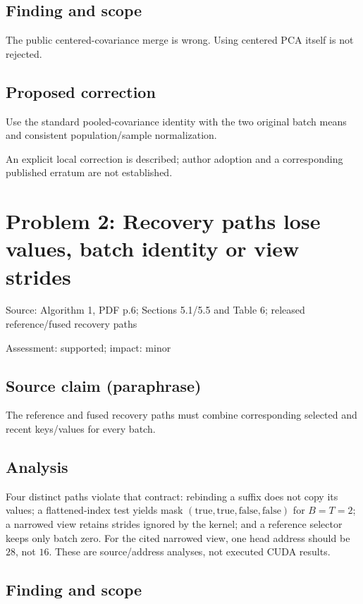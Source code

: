 \documentclass[11pt]{article}
\begin{document}
\subsection*{Finding and scope}

The public centered-covariance merge is wrong. Using centered PCA itself is not rejected.

\subsection*{Proposed correction}

Use the standard pooled-covariance identity with the two original batch means and consistent population/sample normalization.

An explicit local correction is described; author adoption and a corresponding published erratum are not established.

\section*{Problem 2: Recovery paths lose values, batch identity or view strides}

Source: Algorithm 1, PDF p.6; Sections 5.1/5.5 and Table 6; released reference/fused recovery paths

Assessment: supported; impact: minor

\subsection*{Source claim (paraphrase)}

The reference and fused recovery paths must combine corresponding selected and recent keys/values for every batch.

\subsection*{Analysis}

Four distinct paths violate that contract: rebinding a suffix does not copy its values; a flattened-index test yields mask \((\mathrm{true},\mathrm{true},\mathrm{false},\mathrm{false})\) for \(B=T=2\); a narrowed view retains strides ignored by the kernel; and a reference selector keeps only batch zero. For the cited narrowed view, one head address should be \(28\), not \(16\). These are source/address analyses, not executed CUDA results.

\subsection*{Finding and scope}
\end{document}
